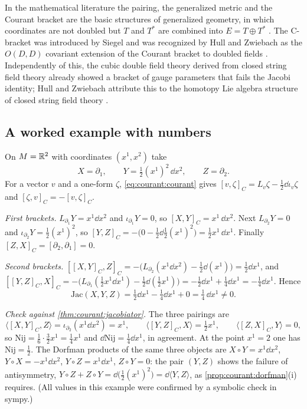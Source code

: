 \begin{historybox}
In the mathematical literature the pairing, the generalized metric and the Courant bracket are
the basic structures of generalized geometry, in which coordinates are not doubled but $T$ and
$T^*$ are combined into $E=T\oplus T^*$ . The C-bracket was introduced
by Siegel and was recognized by Hull and Zwiebach as the $O(D,D)$ covariant extension of the
Courant bracket to doubled fields . Independently of this, the cubic
double field theory derived from closed string field theory already showed a bracket of gauge
parameters that fails the Jacobi identity; Hull and Zwiebach attribute this to the homotopy Lie
algebra structure of closed string field theory .
\end{historybox}

\subsection{A worked example with numbers}\label{sec:courant:example}

\begin{example}\label{ex:courant:jac}
On $M=\mathbb{R}^2$ with coordinates $(x^1,x^2)$ take
\[
X=\partial_1,\qquad Y=\tfrac12(x^1)^2\,\dd x^2,\qquad Z=\partial_2 .
\]
For a vector $v$ and a one-form $\zeta$, \eqref{eq:courant:courant} gives
$[v,\zeta]_C=L_v\zeta-\tfrac12\dd\iota_v\zeta$ and $[\zeta,v]_C=-[v,\zeta]_C$.

\emph{First brackets.} $L_{\partial_1}Y=x^1\dd x^2$ and $\iota_{\partial_1}Y=0$, so
$[X,Y]_C=x^1\,\dd x^2$. Next $L_{\partial_2}Y=0$ and $\iota_{\partial_2}Y=\tfrac12(x^1)^2$, so
$[Y,Z]_C=-\bigl(0-\tfrac12\dd\tfrac12(x^1)^2\bigr)=\tfrac12x^1\,\dd x^1$. Finally
$[Z,X]_C=[\partial_2,\partial_1]=0$.

\emph{Second brackets.} $[[X,Y]_C,Z]_C=-\bigl(L_{\partial_2}(x^1\dd x^2)-\tfrac12\dd(x^1)\bigr)
=\tfrac12\dd x^1$, and
$[[Y,Z]_C,X]_C=-\bigl(L_{\partial_1}(\tfrac12x^1\dd x^1)-\tfrac12\dd(\tfrac12x^1)\bigr)
=-\tfrac12\dd x^1+\tfrac14\dd x^1=-\tfrac14\dd x^1$. Hence
\[
\mathrm{Jac}(X,Y,Z)=\tfrac12\dd x^1-\tfrac14\dd x^1+0=\tfrac14\,\dd x^1\neq0 .
\]

\emph{Check against \cref{thm:courant:jacobiator}.} The three pairings are
\[
\langle[X,Y]_C,Z\rangle=\iota_{\partial_2}(x^1\dd x^2)=x^1,\qquad
\langle[Y,Z]_C,X\rangle=\tfrac12x^1,\qquad \langle[Z,X]_C,Y\rangle=0,
\]
so $\mathrm{Nij}=\tfrac16\cdot\tfrac32x^1=\tfrac14x^1$ and
$\dd\mathrm{Nij}=\tfrac14\dd x^1$, in agreement. At the point $x^1=2$ one has
$\mathrm{Nij}=\tfrac12$. The Dorfman products of the same three objects are
$X\circ Y=x^1\dd x^2$, $Y\circ X=-x^1\dd x^2$, $Y\circ Z=x^1\dd x^1$, $Z\circ Y=0$: the pair
$(Y,Z)$ shows the failure of antisymmetry, $Y\circ Z+Z\circ Y=\dd\bigl(\tfrac12(x^1)^2\bigr)
=\dd\langle Y,Z\rangle$, as \cref{prop:courant:dorfman}(i) requires.
(All values in this example were confirmed by a symbolic check in sympy.)
\end{example}

